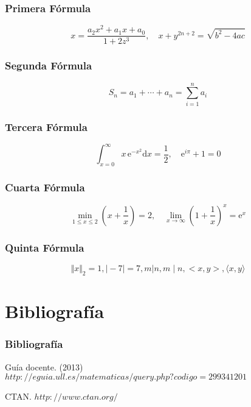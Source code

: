 \documentclass{beamer}
\begin{document}
\begin{frame}
\frametitle{Primera Fórmula}

\[x=\frac{a_2 x^2 + a_1 x + a_0}{1+2z^3}, \quad
x+y^{2n+2}=\sqrt{b^2-4ac}
\]

\end{frame}

\begin{frame}
\frametitle{Segunda Fórmula}
\[ S_n=a_1+\cdots + a_n = \sum_{i=1}^n a_i \]

\end{frame}

\begin{frame}
\frametitle{Tercera Fórmula}

\[
\int_{x=0}^{\infty} x\,\text{e}^{-x^2}
\text{d}x=\frac{1}{2},\quad\text{e}^{i\pi}+1=0
\]

\end{frame}

\begin{frame}
\frametitle{Cuarta Fórmula}

\[
\min_{1\le x\le 2}\left(x+\frac{1}{x}\right)=2,
\quad \lim_{x\to\infty}
\left(1+\frac{1}{x}\right)^x = \text{e}^x
\]

\end{frame}

\begin{frame}
\frametitle{Quinta Fórmula}

\[
\Vert x \Vert_2=1, \vert -7 \vert = 7,
m|n, m\mid n, <x,y>, \langle x, y\rangle
\]

\end{frame}

\section{Bibliografía}
\begin{frame}
  \frametitle{Bibliografía}

  \begin{thebibliography}{10}

    \beamertemplatebookbibitems
    Guía docente.
    (2013)
    {\small $http://eguia.ull.es/matematicas/query.php?codigo=299341201$}

    \beamertemplatebookbibitems
    CTAN. {\small $http://www.ctan.org/$}

  \end{thebibliography}
\end{frame}

\end{document}

